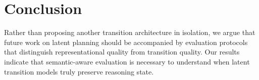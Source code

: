 \section{Conclusion}

Rather than proposing another transition architecture in isolation, we argue that future work on latent planning should be accompanied by evaluation protocols that distinguish representational quality from transition quality. Our results indicate that semantic-aware evaluation is necessary to understand when latent transition models truly preserve reasoning state.
